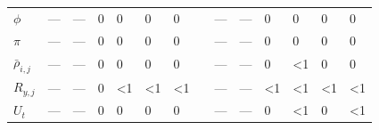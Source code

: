 \documentclass[12pt,]{book}
\theoremstyle{definition}
\theoremstyle{definition}
\theoremstyle{definition}
\theoremstyle{remark}
\begin{document}
\begin{table}
\begin{tabular}[t]{llllllllllllll}
$\phi$ & --- & --- & 0 & 0 & 0 & 0 &  & --- & --- & 0 & 0 & 0 & 0\\
$\pi$ & --- & --- & 0 & 0 & 0 & 0 &  & --- & --- & 0 & 0 & 0 & 0\\
$\bar{\rho}_{i,j}$ & --- & --- & 0 & 0 & 0 & 0 &  & --- & --- & 0 & <1 & 0 & 0\\
$R_{y,j}$ & --- & --- & 0 & <1 & <1 & <1 &  & --- & --- & <1 & <1 & <1 & <1\\
$U_{t}$ & --- & --- & 0 & 0 & 0 & 0 &  & --- & --- & 0 & <1 & 0 & <1\\
\bottomrule
\end{tabular}
\end{table}

\clearpage

\begin{table}


\end{table}
\end{document}
